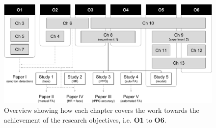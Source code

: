 \begin{figure}[h]
    \centering
    \includegraphics[width=\textwidth]{Content/figures/research-chapters-overview}
    \caption{Overview showing how each chapter covers the work towards the achievement of the research objectives, i.e. \textbf{O1} to \textbf{O6}.}
    \label{fig:research-chapters-overview}
\end{figure}

